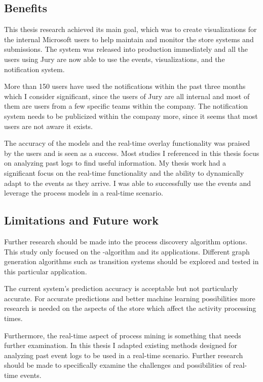 
\subsection{Benefits} 
\label{sec:benefits}

This thesis research achieved its main goal, which was to create visualizations for the internal Microsoft users to help maintain and monitor the store systems and submissions.
The system was released into production immediately and all the users using Jury are now able to use the events, visualizations, and the notification system.

More than 150 users have used the notifications within the past three months which I consider significant, 
since the users of Jury are all internal and most of them are users from a few specific teams within the company.
The notification system needs to be publicized within the company more, since it seems that most users are not aware it exists.

The accuracy of the models and the real-time overlay functionality was praised by the users and is seen as a success.
Most studies I referenced in this thesis focus on analyzing past logs to find useful information.
My thesis work had a significant focus on the real-time functionality and the ability to dynamically adapt to the events as they arrive.
I was able to successfully use the events and leverage the process models in a real-time scenario.

\subsection{Limitations and Future work}

Further research should be made into the process discovery algorithm options.
This study only focused on the \textalpha-algorithm and its applications. 
Different graph generation algorithms such as transition systems \cite{van2013discovering} should be explored and tested in this particular application.

The current system's prediction accuracy is acceptable but not particularly accurate.
For accurate predictions and better machine learning possibilities more research is needed on the aspects of the store which affect the activity processing times.

Furthermore, the real-time aspect of process mining is something that needs further examination. In this thesis I adapted existing methods designed for analyzing past event logs to be used in a real-time scenario.
Further research should be made to specifically examine the challenges and possibilities of real-time events.

